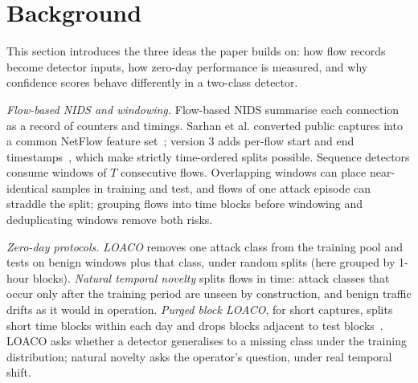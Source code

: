 \documentclass[conference]{IEEEtran}
\begin{document}
\section{Background}\label{sec:bg}
This section introduces the three ideas the paper builds on: how flow records become detector inputs, how zero-day performance is measured, and why confidence scores behave differently in a two-class detector.

\emph{Flow-based NIDS and windowing.} Flow-based NIDS summarise each connection as a record of counters and timings. Sarhan et al. converted public captures into a common NetFlow feature set~\cite{sarhan2021netflow}; version 3 adds per-flow start and end timestamps~\cite{luay2025}, which make strictly time-ordered splits possible. Sequence detectors consume windows of $T$ consecutive flows. Overlapping windows can place near-identical samples in training and test, and flows of one attack episode can straddle the split; grouping flows into time blocks before windowing and deduplicating windows remove both risks.

\emph{Zero-day protocols.} \emph{LOACO} removes one attack class from the training pool and tests on benign windows plus that class, under random splits (here grouped by 1-hour blocks). \emph{Natural temporal novelty} splits flows in time: attack classes that occur only after the training period are unseen by construction, and benign traffic drifts as it would in operation. \emph{Purged block LOACO}, for short captures, splits short time blocks within each day and drops blocks adjacent to test blocks~\cite{lopezdeprado2018}. LOACO asks whether a detector generalises to a missing class under the training distribution; natural novelty asks the operator's question, under real temporal shift.
\end{document}
